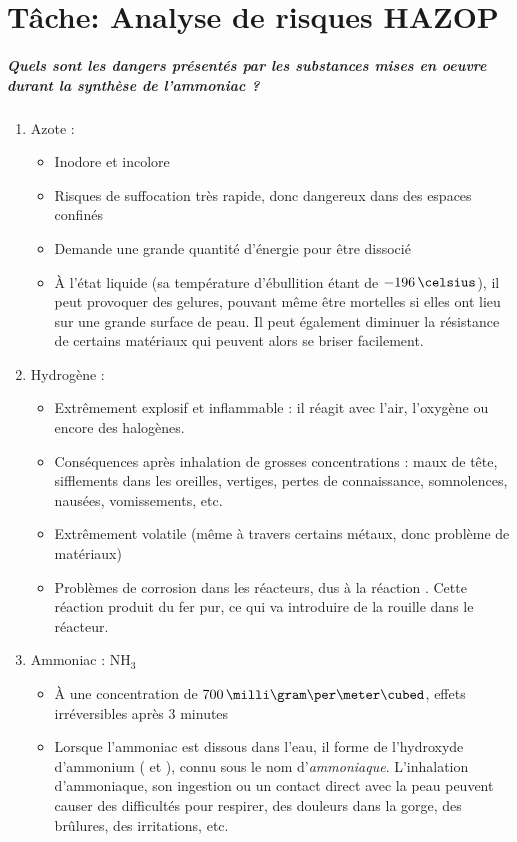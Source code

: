\chapter{Tâche: Analyse de risques HAZOP}

\paragraph{Quels sont les dangers présentés par les substances mises en oeuvre durant la synthèse de l'ammoniac ?}
\begin{enumerate}
\item Azote : 
\begin{itemize}
\item Inodore et incolore
\item Risques de suffocation très rapide, donc dangereux dans des espaces confinés
\item Demande une grande quantité d’énergie pour être dissocié
\item À l'état liquide (sa température d'ébullition étant de $-196\,\celsius$), il peut provoquer des gelures, pouvant même être mortelles si elles ont lieu sur une grande surface de peau. Il peut également diminuer la résistance de certains matériaux qui peuvent alors se briser facilement.
\end{itemize}
\item Hydrogène : 
\begin{itemize}
\item Extrêmement explosif et inflammable : il réagit avec l'air, l'oxygène ou encore des halogènes.
\item Conséquences après inhalation de grosses concentrations : maux de tête, sifflements dans les oreilles, vertiges, pertes de connaissance, somnolences,  nausées, vomissements, etc.
\item Extrêmement volatile (même à travers certains métaux, donc problème de matériaux)
\item Problèmes de corrosion dans les réacteurs, dus à la réaction
.
Cette réaction produit du fer pur, ce qui va introduire de la rouille dans le réacteur.
\end{itemize}
\item Ammoniac : NH$_3$
\begin{itemize}
\item À une concentration de $700\,\milli\gram\per\meter\cubed$, effets irréversibles après 3 minutes
\item Lorsque l'ammoniac est dissous dans l'eau, il forme de l'hydroxyde d'ammonium ( et ), connu sous le nom d'\emph{ammoniaque}. L'inhalation d'ammoniaque, son ingestion ou un contact direct avec la peau peuvent causer des difficultés pour respirer, des douleurs dans la gorge, des brûlures, des irritations, etc.

\end{itemize}
\end{enumerate}
